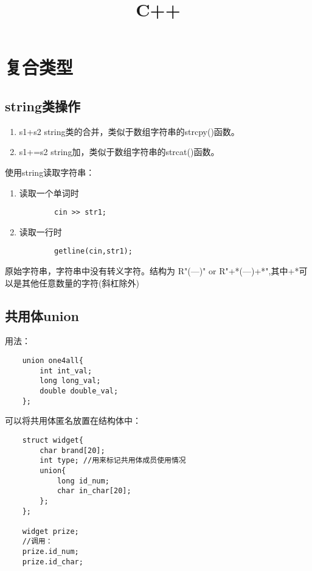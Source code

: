 \documentclass[UTF8]{ctexrep}
\title{C++}
\author{}
\date{}
\begin{document}
\maketitle
\tableofcontents
\newpage

\chapter{复合类型}
\section{string类操作}
\begin{enumerate}
    \item s1+s2 string类的合并，类似于数组字符串的strcpy()函数。
    \item s1+=s2 string加，类似于数组字符串的strcat()函数。
\end{enumerate}

使用string读取字符串：
\begin{enumerate}
    \item 读取一个单词时
    \begin{lstlisting}
        cin >> str1;
    \end{lstlisting}
    \item 读取一行时
    \begin{lstlisting}
        getline(cin,str1);
    \end{lstlisting}
\end{enumerate}

原始字符串，字符串中没有转义字符。结构为
R"(---)" or R"+*(---)+*",其中+*可以是其他任意数量的字符(斜杠除外)


\section{共用体union}
用法：
\begin{lstlisting}
    union one4all{
        int int_val;
        long long_val;
        double double_val;
    };
\end{lstlisting}

可以将共用体匿名放置在结构体中：
\begin{lstlisting}
    struct widget{
        char brand[20];
        int type; //用来标记共用体成员使用情况
        union{
            long id_num;
            char in_char[20];
        };
    };

    widget prize;
    //调用：
    prize.id_num;
    prize.id_char;
\end{lstlisting}
\end{document}
